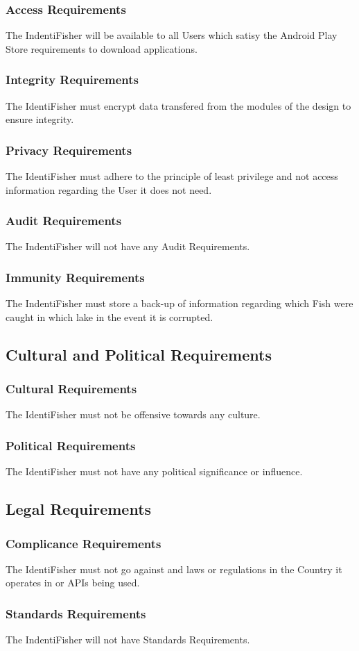\documentclass{article}
\begin{document}
\subsubsection{Access Requirements}
The IndentiFisher will be available to all Users which satisy the Android Play Store requirements to
download applications.
\subsubsection{Integrity Requirements}
The IdentiFisher must encrypt data transfered from the modules of the design to ensure integrity.
\subsubsection{Privacy Requirements}
The IdentiFisher must adhere to the principle of least privilege and not access information regarding
the User it does not need.
\subsubsection{Audit Requirements}
The IndentiFisher will not have any Audit Requirements.
\subsubsection{Immunity Requirements}
The IndentiFisher must store a back-up of information regarding which Fish were caught in which lake
in the event it is corrupted.

\subsection{Cultural and Political Requirements}
\subsubsection{Cultural Requirements}
The IdentiFisher must not be offensive towards any culture.
\subsubsection{Political Requirements}
The IdentiFisher must not have any political significance or influence.

\subsection{Legal Requirements}
\subsubsection{Complicance Requirements}
The IdentiFisher must not go against and laws or regulations in the Country
it operates in or APIs being used.
\subsubsection{Standards Requirements}
The IndentiFisher will not have Standards Requirements.

\newpage
\listoffigures
\end{document}
